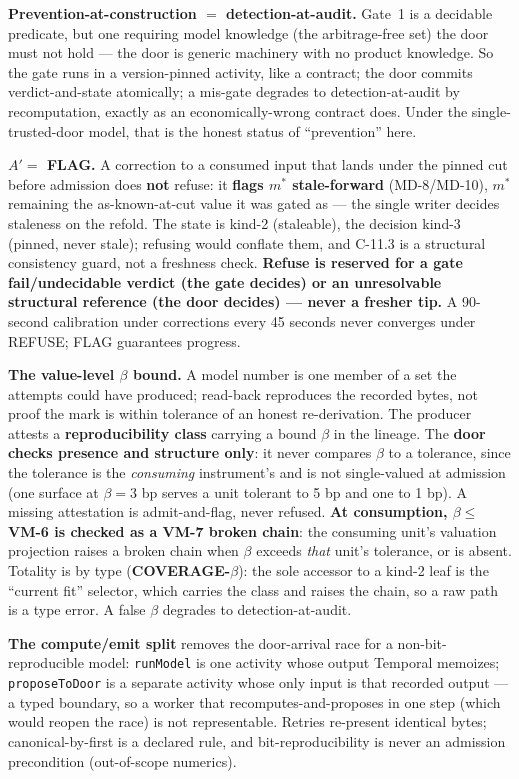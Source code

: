 \documentclass[11pt,a4paper]{article}
\begin{document}
\textbf{Prevention-at-construction $=$ detection-at-audit.} Gate~1 is a decidable predicate, but one
requiring model knowledge (the arbitrage-free set) the door must not hold --- the door is generic
machinery with no product knowledge. So the gate runs in a version-pinned activity, like a contract; the
door commits verdict-and-state atomically; a mis-gate degrades to detection-at-audit by recomputation,
exactly as an economically-wrong contract does. Under the single-trusted-door model, that is the honest
status of ``prevention'' here.

\textbf{$A'=$ FLAG.} A correction to a consumed input that lands under the pinned cut before admission
does \textbf{not} refuse: it \textbf{flags $m^\ast$ stale-forward} (MD-8/MD-10), $m^\ast$ remaining the
as-known-at-cut value it was gated as --- the single writer decides staleness on the refold. The state
is kind-2 (staleable), the decision kind-3 (pinned, never stale); refusing would conflate them, and
C-11.3 is a structural consistency guard, not a freshness check. \textbf{Refuse is reserved for a gate
fail/undecidable verdict (the gate decides) or an unresolvable structural reference (the door decides)
--- never a fresher tip.} A 90-second calibration under corrections every 45 seconds never converges
under REFUSE; FLAG guarantees progress.

\textbf{The value-level $\beta$ bound.} A model number is one member of a set the attempts could have
produced; read-back reproduces the recorded bytes, not proof the mark is within tolerance of an honest
re-derivation. The producer attests a \textbf{reproducibility class} carrying a bound $\beta$ in the
lineage. The \textbf{door checks presence and structure only}: it never compares $\beta$ to a tolerance,
since the tolerance is the \emph{consuming} instrument's and is not single-valued at admission (one
surface at $\beta = 3$ bp serves a unit tolerant to 5 bp and one to 1 bp). A missing attestation is
admit-and-flag, never refused. \textbf{At consumption, $\beta \le$ VM-6 is checked as a VM-7 broken
chain}: the consuming unit's valuation projection raises a broken chain when $\beta$ exceeds \emph{that}
unit's tolerance, or is absent. Totality is by type (\textbf{COVERAGE-$\beta$}): the sole accessor to a
kind-2 leaf is the ``current fit'' selector, which carries the class and raises the chain, so a raw path
is a type error. A false $\beta$ degrades to detection-at-audit.

\textbf{The compute/emit split} removes the door-arrival race for a non-bit-reproducible model:
\texttt{runModel} is one activity whose output Temporal memoizes; \texttt{proposeToDoor} is a separate
activity whose only input is that recorded output --- a typed boundary, so a worker that
recomputes-and-proposes in one step (which would reopen the race) is not representable. Retries
re-present identical bytes; canonical-by-first is a declared rule, and bit-reproducibility is never an
admission precondition (out-of-scope numerics).
\end{document}

